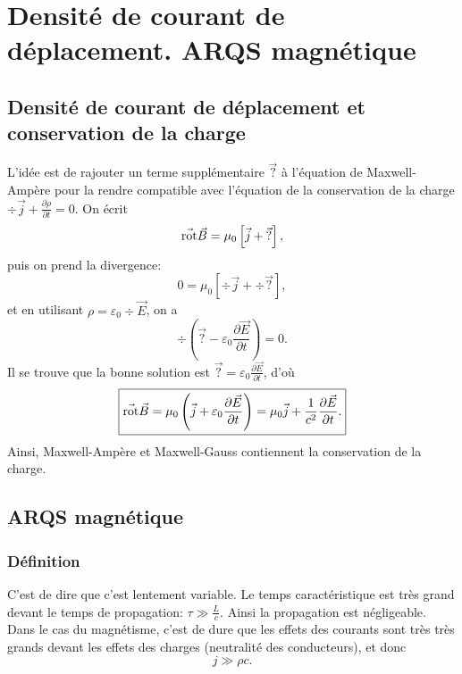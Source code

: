 \section{Densité de courant de déplacement. ARQS magnétique}
\subsection{Densité de courant de déplacement et conservation de la charge}

L'idée est de rajouter un terme supplémentaire $\vec{?}$ à l'équation de Maxwell-Ampère pour la rendre compatible avec l'équation de la conservation de la charge $\div\vec{j}+\frac{\partial\rho}{\partial t}=0$.
On écrit 
\begin{equation}
    \vec{\mathrm{rot}}\vec{B}=\mu_0\left[\vec{j}+\vec{?}\right],
\end{equation}
puis on prend la divergence:
\begin{equation}
    0=\mu_0\left[\div\vec{j}+\div\vec{?}\right],
\end{equation}
et en utilisant $\rho=\varepsilon_0\div\vec{E}$, on a 
\begin{equation}
    \div\left(\vec{?}-\varepsilon_0\frac{\partial\vec{E}}{\partial t}\right)=0.
\end{equation}
Il se trouve que la bonne solution est $\vec{?}=\varepsilon_0\frac{\partial\vec{E}}{\partial t}$, d'où
\begin{equation}
    \boxed{
        \vec{\mathrm{rot}}\vec{B}=\mu_0\left(\vec{j}+\varepsilon_0\frac{\partial\vec{E}}{\partial t}\right)=\mu_0\vec{j}+\frac{1}{c^{2}}\frac{\partial\vec{E}}{\partial t}.
    }
\end{equation}
Ainsi, Maxwell-Ampère et Maxwell-Gauss contiennent la conservation de la charge.

\subsection{ARQS magnétique}
\subsubsection{Définition}
C'est de dire que c'est \og lentement variable\fg. Le temps caractéristique est très grand devant le temps de propagation: $\tau\gg\frac{L}{c}$. Ainsi la propagation est négligeable. Dans le cas du magnétisme, c'est de dure que les effets des courants sont très très grands devant les effets des charges (neutralité des conducteurs), et donc 
\begin{equation}
    \boxed{
        j\gg\rho c.
    }
\end{equation}

